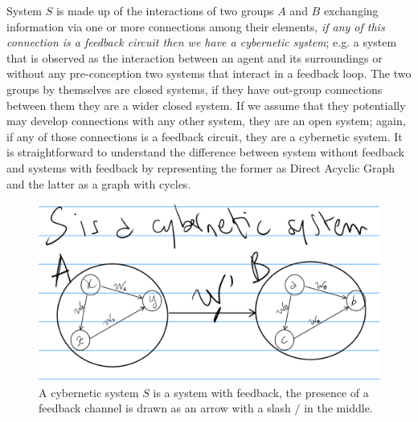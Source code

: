 \documentclass[14pt,a4paper]{extarticle}
\begin{document}
\hspace*{15mm}System \(S\) is made up of the interactions of two groups \(A\) and \(B\) exchanging information via one or more connections among their elements, \textit{if any of this connection is a feedback circuit then we have a cybernetic system}; e.g. a system that is observed as the interaction between an agent and its surroundings or without any pre-conception two systems that interact in a feedback loop.
\newline 
\hspace*{15mm}The two groups by themselves are closed systems, if they have out-group connections between them they are a wider closed system. If we assume that they potentially may develop connections with any other system, they are an open system; again, if any of those connections is a feedback circuit, they are a cybernetic system.
\newline 
\hspace*{15mm} It is straightforward to understand the difference between system without feedback and systems with feedback by representing the former as Direct Acyclic Graph and the latter as a graph with cycles.

\vspace{0.5cm}

\begin{figure}[htbp]
\begin{minipage}[t]{0.90\linewidth}
    \includegraphics[width=\linewidth]{Fig__4_cybernetic_systems.eps}
	\caption{A cybernetic system \(S\) is a system with feedback, the presence of a feedback channel is drawn as an arrow with a slash \(/\) in the middle.}%
	\label{fig:fig4}
\end{minipage}%
\end{figure}
\end{document}

